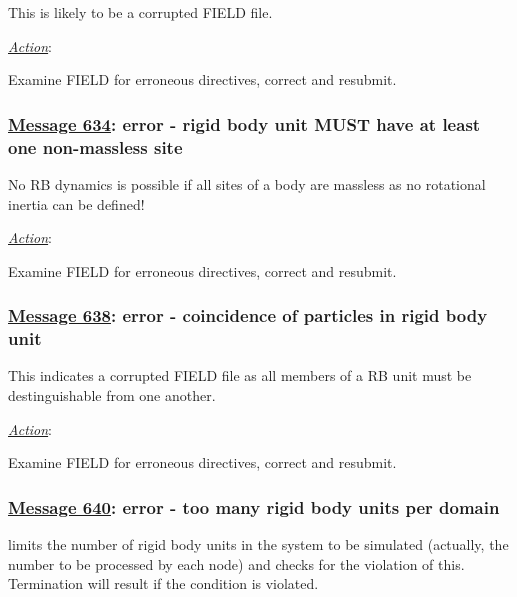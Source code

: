 This is likely to be a corrupted FIELD file.

\noindent \underline{\em Action}:

Examine FIELD for erroneous directives, correct and resubmit.

\subsubsection*{\underline{Message 634}: error - rigid body unit MUST have at least one non-massless site}

No RB dynamics is possible if all sites of a body are massless as no rotational inertia can be defined!

\noindent \underline{\em Action}:

Examine FIELD for erroneous directives, correct and resubmit.

%
%
%

\subsubsection*{\underline{Message 638}: error - coincidence of particles in rigid body unit}

This indicates a corrupted FIELD file as all members of a RB unit
must be destinguishable from one another.

\noindent \underline{\em Action}:

Examine FIELD for erroneous directives, correct and resubmit.

\subsubsection*{\underline{Message 640}: error - too many rigid body units per domain}

\D limits the number of rigid body units
in the system to be simulated (actually, the number to be processed
by each node) and checks for the violation of this.  Termination will
result if the condition is violated.

